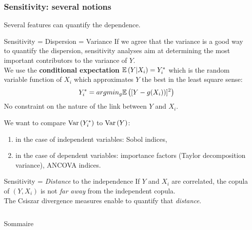 \documentclass[8pt]{beamer}
\begin{document}
\begin{frame}
\frametitle{Sensitivity: several notions}
\small

Several features can quantify the dependence.

\begin{block}{Sensitivity = Dispersion = Variance}
If we agree that  the \alert{variance is a good way to quantify the dispersion}, sensitivity analyses aim at determining the most important contributors to the variance of $Y$. \\
We use the {\bf conditional expectation}  $\mathbb{E}\left( Y|X_i \right) = Y^*_i$ which is the random variable function of $X_i$ which approximates $Y$ the best  in the least square sense: 
\begin{align*}
Y^*_i = argmin_{g} \mathbb{E}\left( [Y-g(X_i))]^2 \right)
\end{align*}
No constraint on the nature of the link between $Y$ and $X_i$.\\
\vspace*{0.1cm}

We want to compare  \alert{$\mbox{Var}\left( Y^*_i \right)$} to \alert{$\mbox{Var}\left( Y \right)$}:
 \begin{enumerate}
  \item in the case of independent variables: \alert{Sobol indices},
  \item in the case of dependent variables: importance factors (\alert{Taylor decomposition variance}), \alert{ANCOVA indices}.
 \end{enumerate}
\end{block}

\begin{block}{Sensitivity = \emph{Distance} to the independence}
 If $Y$ and $X_i$ are correlated, the  copula of $(Y,X_i)$ is not \emph{far away} from the independent copula.\\
 The \alert{Csiszar divergence measures} enable to quantify that \emph{distance}.
\end{block}

\end{frame}



\begin{frame}
  \begin{columns}

    {\huge{Sommaire}}
    \vspace{1cm}
    \small{\tableofcontents}
  \end{columns}
\end{frame}
\end{document}
